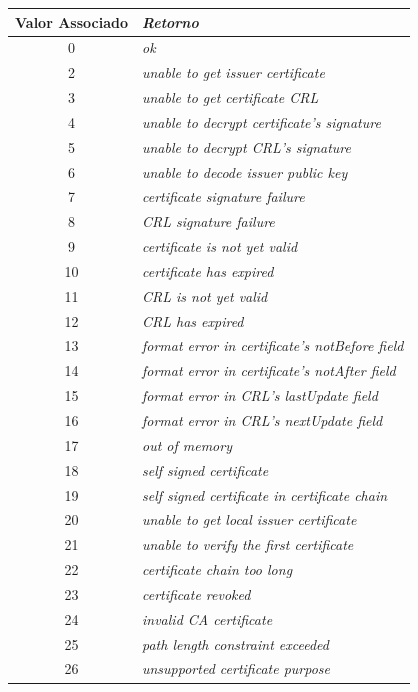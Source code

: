 	\begin{center}
		\begin{longtable}{c>{\em}l}
		\toprule
		\textbf{Valor Associado} & \textbf{Retorno} \\ \midrule
		0 & ok \\ 
		\rowcolor[gray]{0.9}
		2 & unable to get issuer certificate \\ 
		3 & unable to get certificate CRL \\ 
		\rowcolor[gray]{0.9}
		4 & unable to decrypt certificate's signature \\ 
		5 & unable to decrypt CRL's signature \\ 
		\rowcolor[gray]{0.9}
		6 & unable to decode issuer public key \\ 
		7 & certificate signature failure \\ 
		\rowcolor[gray]{0.9}
		8 & CRL signature failure \\ 
		9 & certificate is not yet valid \\ 
		\rowcolor[gray]{0.9}
		10 & certificate has expired \\ 
		11 & CRL is not yet valid \\ 
		\rowcolor[gray]{0.9}
		12 & CRL has expired \\ 
		13 & format error in certificate's notBefore field \\ 
		\rowcolor[gray]{0.9}
		14 & format error in certificate's notAfter field \\ 
		15 & format error in CRL's lastUpdate field \\ 
		\rowcolor[gray]{0.9}
		16 & format error in CRL's nextUpdate field \\ 
		17 & out of memory \\ 
		\rowcolor[gray]{0.9}
		18 & self signed certificate \\ 
		19 & self signed certificate in certificate chain \\ 
		\rowcolor[gray]{0.9}
		20 & unable to get local issuer certificate \\ 
		21 & unable to verify the first certificate \\ 
		\rowcolor[gray]{0.9}
		22 & certificate chain too long \\ 
		23 & certificate revoked \\ 
		\rowcolor[gray]{0.9}
		24 & invalid CA certificate \\ 
		25 & path length constraint exceeded \\ 
		\rowcolor[gray]{0.9}
		26 & unsupported certificate purpose \\ 

\end{longtable}
\end{center}
